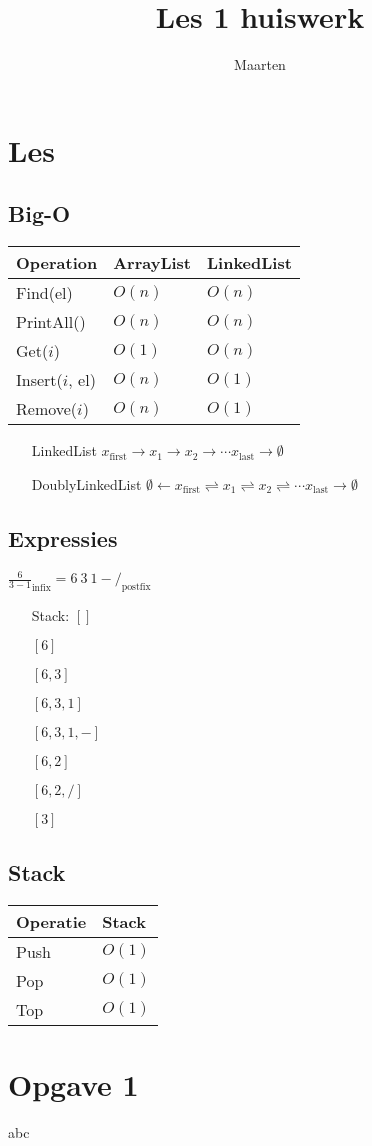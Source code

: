 \documentclass[12pt,a4paper]{article}
\title{Les 1 huiswerk}
\author{Maarten}
\begin{document}
\maketitle
\section{Les}
\subsection{Big-O}

\begin{tabular}{l|l|l}
Operation & ArrayList & LinkedList \\
\hline
Find(el)        & $O(n)$ & $O(n)$ \\
PrintAll()      & $O(n)$ & $O(n)$ \\
Get($i$)        & $O(1)$ & $O(n)$ \\
Insert($i$, el) & $O(n)$ & $O(1)$ \\
Remove($i$)     & $O(n)$ & $O(1)$ \\
\end{tabular}

\begin{itemize}
\item[LinkedList] \( x_\text{first} \rightarrow x_1 \rightarrow x_2 \rightarrow \cdots x_\text{last} \rightarrow \emptyset \)
\item[DoublyLinkedList] \( \emptyset \leftarrow x_\text{first} \rightleftharpoons x_1 \rightleftharpoons x_2 \rightleftharpoons \cdots x_\text{last} \rightarrow \emptyset \)
\end{itemize}

\subsection{Expressies}
$\frac{6}{3-1}_\text{infix} = 6\ 3\ 1 - /_\text{postfix}$
\begin{itemize}
\item[Stack:] $[]$
\item[] $[6]$
\item[] $[6,3]$
\item[] $[6,3,1]$
\item[] $[6,3,1,-]$
\item[] $[6,2]$
\item[] $[6,2,/]$
\item[] $[3]$
\end{itemize}

\subsection{Stack}
\begin{tabular}{l|l}
Operatie & Stack \\
\hline
Push & $O(1)$ \\
Pop  & $O(1)$ \\
Top  & $O(1)$ \\
\end{tabular}

\section{Opgave 1}
abc
\end{document}
